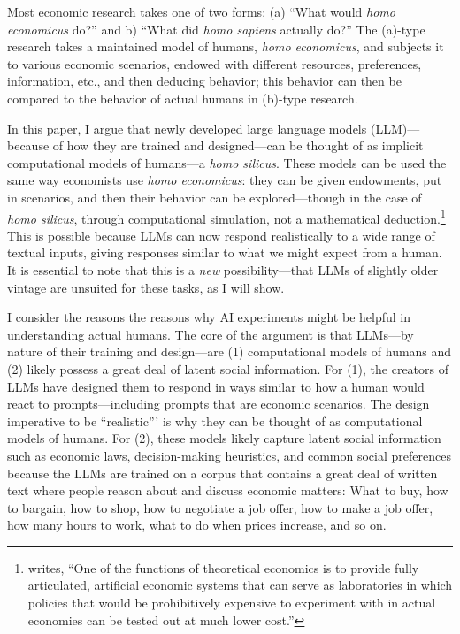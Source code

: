 \documentclass[11pt]{article}
\begin{document}
Most economic research takes one of two forms: (a) ``What would \emph{homo economicus} do?'' and b) ``What did \emph{homo sapiens} actually do?'' 
The (a)-type research takes a maintained model of humans, \emph{homo economicus}, and subjects it to various economic scenarios, endowed with different resources, preferences, information, etc., and then deducing behavior;
this behavior can then be compared to the behavior of actual humans in (b)-type research.

In this paper, I argue that newly developed large language models (LLM)---because of how they are trained and designed---can be thought of as implicit computational models of humans---a \emph{homo silicus}.
These models can be used the same way economists use \emph{homo economicus}: they can be given endowments, put in scenarios, and then their behavior can be explored---though in the case of \emph{homo silicus}, through computational simulation, not a mathematical
deduction.\footnote{\cite{lucas1980} writes, 
``One of the functions of theoretical economics is to provide fully articulated, artificial economic systems that can serve as laboratories in which policies that would be prohibitively expensive to experiment with in actual economies can be tested out at much lower cost.''}
This is possible because LLMs can now respond realistically to a wide range of textual inputs, giving responses similar to what we might expect from a human.
It is essential to note that this is a \emph{new} possibility---that LLMs of slightly older vintage are unsuited for these tasks, as I will show. 

I consider the reasons the reasons why AI experiments might be helpful in understanding actual humans.
The core of the argument is that LLMs---by nature of their training and design---are (1) computational models of humans and (2) likely possess a great deal of latent social information.
For (1), the creators of LLMs have designed them to respond in ways similar to how a human would react to prompts---including prompts that are economic scenarios.
The design imperative to be ``realistic''' is why they can be thought of as computational models of humans.
For (2), these models likely capture latent social information such as economic laws, decision-making heuristics, and common social preferences because the LLMs are trained on a corpus that contains a great deal of written text where people reason about and discuss economic matters:
What to buy, how to bargain, how to shop, how to negotiate a job offer, how to make a job offer, how many hours to work, what to do when prices increase, and so on.
\end{document}
